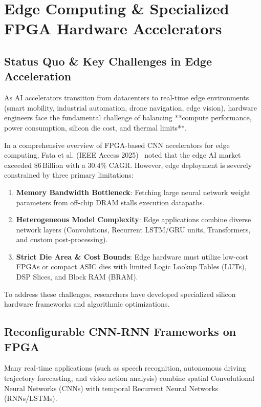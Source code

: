 \chapter{Edge Computing \& Specialized FPGA Hardware Accelerators}
\label{ch:edge_specialized}

\section{Status Quo \& Key Challenges in Edge Acceleration}
As AI accelerators transition from datacenters to real-time edge environments (smart mobility, industrial automation, drone navigation, edge vision), hardware engineers face the fundamental challenge of balancing **compute performance, power consumption, silicon die cost, and thermal limits**.

In a comprehensive overview of FPGA-based CNN accelerators for edge computing, Fata et al. (IEEE Access 2025)~\cite{fata2025balancing} noted that the edge AI market exceeded $\$6\,\text{Billion}$ with a $30.4\%$ CAGR. However, edge deployment is severely constrained by three primary limitations:
\begin{enumerate}[leftmargin=*]
    \item \textbf{Memory Bandwidth Bottleneck}: Fetching large neural network weight parameters from off-chip DRAM stalls execution datapaths.
    \item \textbf{Heterogeneous Model Complexity}: Edge applications combine diverse network layers (Convolutions, Recurrent LSTM/GRU units, Transformers, and custom post-processing).
    \item \textbf{Strict Die Area \& Cost Bounds}: Edge hardware must utilize low-cost FPGAs or compact ASIC dies with limited Logic Lookup Tables (LUTs), DSP Slices, and Block RAM (BRAM).
\end{enumerate}

To address these challenges, researchers have developed specialized silicon hardware frameworks and algorithmic optimizations.

\section{Reconfigurable CNN-RNN Frameworks on FPGA}
Many real-time applications (such as speech recognition, autonomous driving trajectory forecasting, and video action analysis) combine spatial Convolutional Neural Networks (CNNs) with temporal Recurrent Neural Networks (RNNs/LSTMs).

